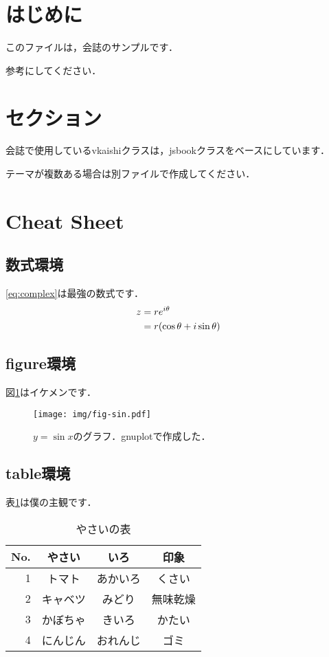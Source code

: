 \documentclass[uplatex,dvipdfmx]{vkaishi}
\begin{document}

\vcmaketitle %



\section*{はじめに}
このファイルは，会誌のサンプルです．\par
参考にしてください．

\section{セクション}
会誌で使用しているvkaishiクラスは，jsbookクラスをベースにしています．\par
テーマが複数ある場合は別ファイルで作成してください．

\section{Cheat Sheet}

\subsection{数式環境}
\eqref{eq:complex}は最強の数式です．
\begin{align}
  z &= r e^{i\theta} \notag \\
    &= r (\cos\theta + i\sin\theta) \label{eq:complex}
\end{align}

\subsection{figure環境}
図\ref{fig:sin}はイケメンです．
\begin{figure}[htbp]
  \centering
  \texttt{[image: img/fig-sin.pdf]}
  \caption{$y=\sin x$のグラフ．gnuplotで作成した．}
  \label{fig:sin}
\end{figure}

\subsection{table環境}
表\ref{tbl:vegetable}は僕の主観です．
\begin{table}[htbp]
  \centering
  \caption{やさいの表}
  \label{tbl:vegetable}
  \begin{tabular}{r|ccc} \hline
    No. & やさい & いろ & 印象 \\ \hline
    1 & トマト & あかいろ & くさい \\
    2 & キャベツ & みどり & 無味乾燥 \\
    3 & かぼちゃ & きいろ & かたい \\
    4 & にんじん & おれんじ & ゴミ \\ \hline
  \end{tabular}
\end{table}
\end{document}
